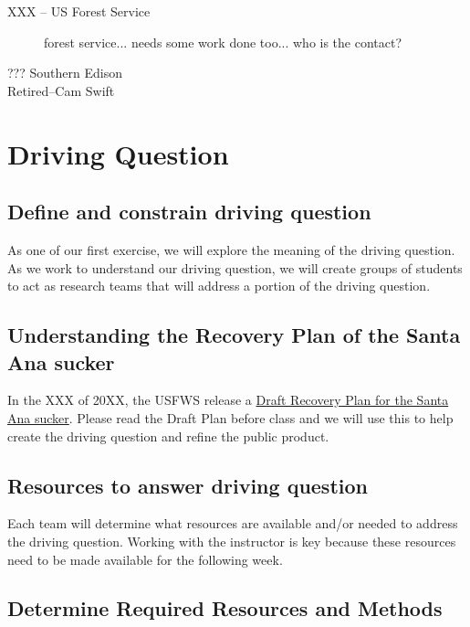 \documentclass{tufte-handout}\usepackage[]{graphicx}\usepackage[]{color}
\begin{document}
\begin{description}
\item[XXX -- US Forest Service]

forest service... needs some work done too... who is the contact?

\item[??? Southern Edison]


\item[Retired--Cam Swift]

\end{description}



\section{Driving Question}

\subsection{Define and constrain driving question}

As one of our first exercise, we will explore the meaning of the driving question. As we work to understand our driving question, we will create groups of students to act as research teams that will address a portion of the driving question.

\subsection{Understanding the Recovery Plan of the Santa Ana sucker}

In the XXX of 20XX, the USFWS release a \href{https://www.fws.gov/carlsbad/SpeciesStatusList/RP/201411xx_Draft%20RP_SASU.pdf}{Draft Recovery Plan for the Santa Ana sucker}. Please read the Draft Plan before class and we will use this to help create the driving question and refine the public product. 

\subsection{Resources to answer driving question}

Each team will determine what resources are available and/or needed to address the driving question. Working with the instructor is key because these resources need to be made available for the following week.

\subsection{Determine Required Resources and Methods}
\end{document}
